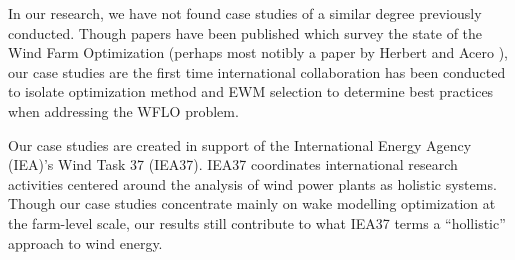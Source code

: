 In our research, we have not found case studies of a similar degree previously conducted.
Though papers have been published which survey the state of the Wind Farm Optimization (perhaps most notibly a paper by Herbert and Acero \cite{HerbertAcero2014}),
our case studies are the first time international collaboration has been conducted to isolate optimization method and EWM selection to determine best practices when addressing the WFLO problem.



Our case studies are created in support of the International Energy Agency (IEA)'s Wind Task 37 (IEA37).
IEA37 coordinates international research activities centered around the analysis of wind power plants as holistic systems\cite{IEATask372017}.
Though our case studies concentrate mainly on wake modelling optimization at the farm-level scale, our results still contribute to what IEA37 terms a ``hollistic'' approach\cite{IEATask372017} to wind energy.